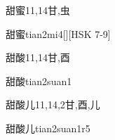 \begin{Entry}{甜蜜}{11,14}{⽢,⾍}
  \begin{Phonetics}{甜蜜}{tian2mi4}[][HSK 7-9]
  \end{Phonetics}
\end{Entry}

\begin{Entry}{甜酸}{11,14}{⽢,⾣}
  \begin{Phonetics}{甜酸}{tian2suan1}
  \end{Phonetics}
\end{Entry}

\begin{Entry}{甜酸儿}{11,14,2}{⽢,⾣,⼉}
  \begin{Phonetics}{甜酸儿}{tian2suan1r5}
  \end{Phonetics}
\end{Entry}


